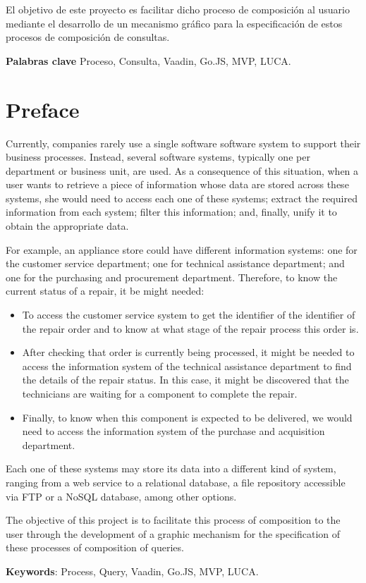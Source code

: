 	
El objetivo de este proyecto es facilitar dicho proceso de composición al usuario mediante el desarrollo de un mecanismo gráfico para la especificación de estos procesos de composición de consultas.

	
 \textbf{Palabras clave}
 Proceso, Consulta, Vaadin, Go.JS, MVP, LUCA.
	
\chapter*{Preface}

Currently, companies rarely use a single software software system to support their business processes. Instead, several software systems, typically one per department or business unit, are used.  As a consequence of this situation, when a user wants to retrieve a piece of information whose data are stored across these
systems, she would need to access each one of these systems; extract the required information from each system; filter this information; and, finally, unify it to obtain the appropriate data.
	
For example, an appliance store could have different information systems: one for the customer service department; one for technical assistance department; and one for the purchasing and procurement department. Therefore, to know the current status of a repair, it be might needed:

\begin{itemize}

    \item To access the customer service system to get the identifier of the identifier of the repair order and to know at what stage of the repair process this order is.
    \item After checking that order is currently being processed, it might be needed to access the information system of the technical assistance department to find the details of the repair status. In this case, it might be discovered that the technicians are waiting for a component to complete the repair.
	\item Finally, to know when this component is expected to be delivered, we would need to access the information system of the purchase and acquisition department.
	\end{itemize}

Each one of these systems may store its data into a different kind of system, ranging from a web service to a relational database, a file repository accessible via FTP or a NoSQL database, among other options.


The objective of this project is to facilitate this process of composition to the user through the development of a graphic mechanism for the specification of these processes of composition of queries.
	

	\textbf{Keywords}:
	Process, Query, Vaadin, Go.JS, MVP, LUCA. 
